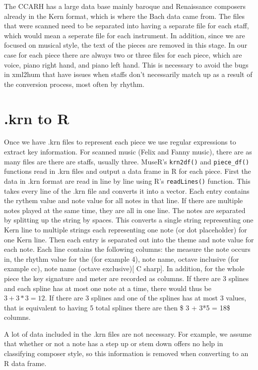 \documentclass[12pt,twoside]{reedthesis}
\theoremstyle{definition}
\theoremstyle{definition}
\theoremstyle{definition}
\theoremstyle{remark}
\begin{document}
The CCARH has a large data base mainly baroque and Renaissance composers
already in the Kern format, which is where the Bach data came from. The
files that were scanned need to be separated into having a separate file
for each staff, which would mean a seperate file for each instrument. In
addition, since we are focused on musical style, the text of the pieces
are removed in this stage. In our case for each piece there are always
two or three files for each piece, which are voice, piano right hand,
and piano left hand. This is necessary to avoid the bugs in xml2hum that
have issues when staffs don't necessarily match up as a result of the
conversion process, most often by rhythm.

\section{.krn to R}\label{krn-to-r}

Once we have .krn files to represent each piece we use regular
expressions to extract key information. For scanned music (Felix and
Fanny music), there are as many files are there are staffs, usually
three. MuseR's \texttt{krn2df()} and \texttt{piece\_df()} functions read
in .krn files and output a data frame in R for each piece. First the
data in .krn format are read in line by line using R's
\texttt{readLines()} function. This takes every line of the .krn file
and converts it into a vector. Each entry contains the rythem value and
note value for all notes in that line. If there are multiple notes
played at the same time, they are all in one line. The notes are
separated by splitting up the string by spaces. This converts a single
string representing one Kern line to multiple strings each representing
one note (or dot placeholder) for one Kern line. Then each entry is
separated out into the theme and note value for each note. Each line
contains the following columns: the measure the note occurs in, the
rhythm value for the (for example 4), note name, octave inclusive (for
example cc), note name (octave exclusive){[} C sharp{]}. In addition,
for the whole piece the key signature and meter are recorded as columns.
If there are 3 splines and each spline has at most one note at a time,
there would thus be \(3 + 3*3=12\). If there are 3 splines and one of
the splines has at most 3 values, that is equivalent to having 5 total
splines there are then \$ 3 + 3*5 = 18\$ columns.

A lot of data included in the .krn files are not necessary. For example,
we assume that whether or not a note has a step up or stem down offers
no help in classifying composer style, so this information is removed
when converting to an R data frame.
\end{document}
